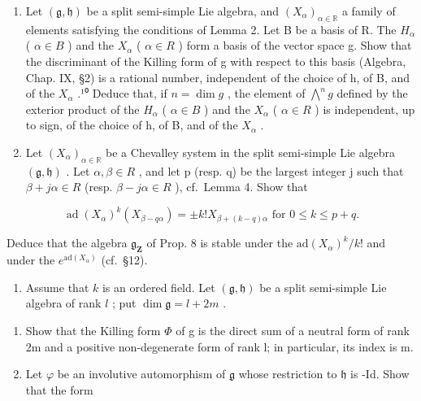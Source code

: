 \begin{enumerate}
\def\labelenumi{\arabic{enumi})}
\setcounter{enumi}{4}
\item
  Let \((\mathfrak{g},\mathfrak{h})\) be a split semi-simple Lie algebra, and \((X_{\alpha})_{\alpha\in\mathbb{R}}\) a family of elements satisfying the conditions of Lemma 2. Let B be a basis of R. The \(H_{\alpha}\) ( \(\alpha\in B\) ) and the \(X_{\alpha}\) ( \(\alpha\in R\) ) form a basis of the vector space g. Show that the discriminant of the Killing form of g with respect to this basis (Algebra, Chap. IX, §2) is a rational number, independent of the choice of h, of B, and of the \(X_{\alpha}\) .¹⁰ Deduce that, if \(n=\dim g\) , the element of \(\bigwedge^{n}g\) defined by the exterior product of the \(H_{\alpha}\) ( \(\alpha\in B\) ) and the \(X_{\alpha}\) ( \(\alpha\in R\) ) is independent, up to sign, of the choice of h, of B, and of the \(X_{\alpha}\) .

  \item
  Let \((X_{\alpha})_{\alpha\in\mathbb{R}}\) be a Chevalley system in the split semi-simple Lie algebra \((\mathfrak{g},\mathfrak{h})\) . Let \(\alpha,\beta\in R\) , and let p (resp. q) be the largest integer j such that \(\beta+j\alpha\in R\) (resp. \(\beta-j\alpha\in R\) ), cf.~Lemma 4. Show that
\end{enumerate}

\[
\operatorname{ad} (X _ {\alpha}) ^ {k} (X _ {\beta - q \alpha}) = \pm k! X _ {\beta + (k - q) \alpha} \text { for } 0 \leq k \leq p + q.
\]

Deduce that the algebra \(\mathfrak{g}_{\mathbf{Z}}\) of Prop. 8 is stable under the \(\mathrm{ad}(X_{\alpha})^k / k!\) and under the \(e^{\mathrm{ad}(X_{\alpha})}\) (cf.~§12).

\begin{enumerate}
\def\labelenumi{\arabic{enumi})}
\setcounter{enumi}{6}
\tightlist
\item
  Assume that \(k\) is an ordered field. Let \((\mathfrak{g},\mathfrak{h})\) be a split semi-simple Lie algebra of rank \(l\) ; put \(\dim \mathfrak{g} = l + 2m\) .
\end{enumerate}

\begin{enumerate}
\def\labelenumi{\alph{enumi})}
\item
  Show that the Killing form \(\varPhi\) of g is the direct sum of a neutral form of rank 2m and a positive non-degenerate form of rank l; in particular, its index is m.
\item
  Let \(\varphi\) be an involutive automorphism of \(\mathfrak{g}\) whose restriction to \(\mathfrak{h}\) is -Id. Show that the form
\end{enumerate}

